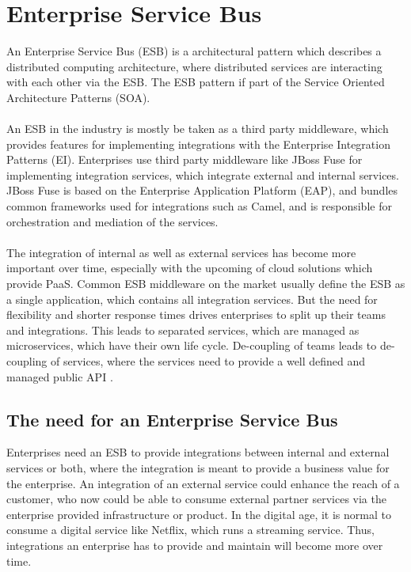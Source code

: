 \chapter{Enterprise Service Bus}
\label{cha:esb}
An Enterprise Service Bus (ESB) is a architectural pattern which describes a distributed computing architecture, where distributed services are interacting with each other via the ESB. The ESB pattern if part of the Service Oriented Architecture Patterns (SOA).   
\\ \\
An ESB in the industry is mostly be taken as a third party middleware, which provides features for implementing integrations with the Enterprise Integration Patterns (EI). Enterprises use third party middleware like JBoss Fuse for implementing integration services, which integrate external and internal services. JBoss Fuse is based on the Enterprise Application Platform (EAP), and bundles common frameworks used for integrations such as Camel, and is responsible for orchestration and mediation of the services.
\\ \\
The integration of internal as well as external services has become more important over time, especially with the upcoming of cloud solutions which provide PaaS. Common ESB middleware on the market usually define the ESB as a single application, which contains all integration services. But the need for flexibility and shorter response times drives enterprises to split up their teams and integrations. This leads to separated services, which are managed as microservices, which have their own life cycle. De-coupling of teams leads to de-coupling of services, where the services need to provide a well defined and managed public API \cite{Camel2015, RedHatAgileIntegration2017, EIP}.

\section{The need for an Enterprise Service Bus}
\label{sec:esb-need-for-esb}
Enterprises need an ESB to provide integrations between internal and external services or both, where the integration is meant to provide a business value for the enterprise. An integration of an external service could enhance the reach of a customer, who now could be able to consume external partner services via the enterprise provided infrastructure or product. In the digital age, it is normal to consume a digital service like Netflix, which runs a streaming service. Thus, integrations an enterprise has to provide and maintain will become more over time.

